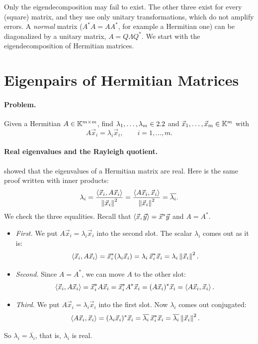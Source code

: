 Only the eigendecomposition may fail to exist. The other three exist for every (square) matrix, and they use only unitary transformations, which do not amplify errors. A \emph{normal} matrix ($A^\ast A = AA^\ast$, for example a Hermitian one) can be diagonalized by a unitary matrix, $A = Q\Lambda Q^\ast$. We start with the eigendecomposition of Hermitian matrices.

\section{Eigenpairs of Hermitian Matrices}

\paragraph{Problem.} Given a Hermitian $A \in \mathbb{K}^{m \times m}$, find $\lambda_1, \dots, \lambda_m \in 2.2$ and $\vec{x}_1, \dots, \vec{x}_m \in \mathbb{K}^m$ with
\begin{equation}
  A\vec{x}_i = \lambda_i\vec{x}_i, \qquad i = 1, \dots, m.
\end{equation}

\paragraph{Real eigenvalues and the Rayleigh quotient.}  showed that the eigenvalues of a Hermitian matrix are real. Here is the same proof written with inner products:
\begin{equation}
  \lambda_i = \frac{\left\langle \vec{x}_i, A\vec{x}_i \right\rangle}{\left\lVert \vec{x}_i \right\rVert^2} = \frac{\left\langle A\vec{x}_i, \vec{x}_i \right\rangle}{\left\lVert \vec{x}_i \right\rVert^2} = \overline{\lambda_i}.
\end{equation}
We check the three equalities. Recall that $\left\langle \vec{x}, \vec{y} \right\rangle = \vec{x}^\ast\vec{y}$ and $A = A^\ast$.
\begin{itemize}
  \item \emph{First.} We put $A\vec{x}_i = \lambda_i\vec{x}_i$ into the second slot. The scalar $\lambda_i$ comes out as it is:
  \begin{equation}
    \left\langle \vec{x}_i, A\vec{x}_i \right\rangle = \vec{x}_i^\ast(\lambda_i\vec{x}_i) = \lambda_i\,\vec{x}_i^\ast\vec{x}_i = \lambda_i\left\lVert \vec{x}_i \right\rVert^2.
  \end{equation}
  \item \emph{Second.} Since $A = A^\ast$, we can move $A$ to the other slot:
  \begin{equation}
    \left\langle \vec{x}_i, A\vec{x}_i \right\rangle = \vec{x}_i^\ast A\vec{x}_i = \vec{x}_i^\ast A^\ast\vec{x}_i = (A\vec{x}_i)^\ast\vec{x}_i = \left\langle A\vec{x}_i, \vec{x}_i \right\rangle.
  \end{equation}
  \item \emph{Third.} We put $A\vec{x}_i = \lambda_i\vec{x}_i$ into the first slot. Now $\lambda_i$ comes out conjugated:
  \begin{equation}
    \left\langle A\vec{x}_i, \vec{x}_i \right\rangle = (\lambda_i\vec{x}_i)^\ast\vec{x}_i = \overline{\lambda_i}\,\vec{x}_i^\ast\vec{x}_i = \overline{\lambda_i}\left\lVert \vec{x}_i \right\rVert^2.
  \end{equation}
\end{itemize}
So $\lambda_i = \overline{\lambda_i}$, that is, $\lambda_i$ is real.

